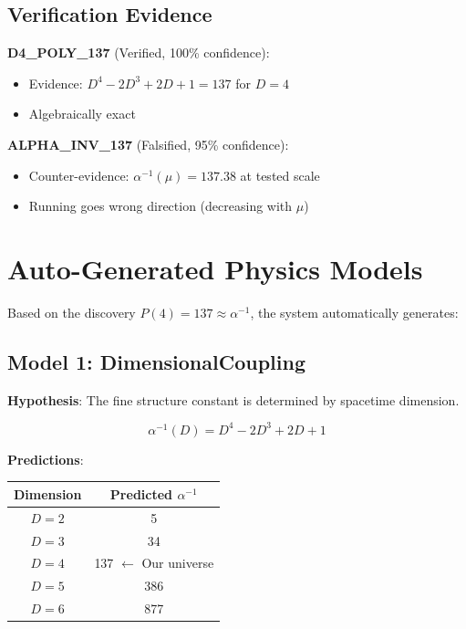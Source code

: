 \documentclass[11pt,a4paper]{article}
\begin{document}
\subsection{Verification Evidence}

\textbf{D4\_POLY\_137} (Verified, 100\% confidence):
\begin{itemize}
    \item Evidence: $D^4 - 2D^3 + 2D + 1 = 137$ for $D = 4$
    \item Algebraically exact
\end{itemize}

\textbf{ALPHA\_INV\_137} (Falsified, 95\% confidence):
\begin{itemize}
    \item Counter-evidence: $\alpha^{-1}(\mu) = 137.38$ at tested scale
    \item Running goes wrong direction (decreasing with $\mu$)
\end{itemize}

\section{Auto-Generated Physics Models}

Based on the discovery $P(4) = 137 \approx \alpha^{-1}$, the system automatically generates:

\subsection{Model 1: DimensionalCoupling}

\textbf{Hypothesis}: The fine structure constant is determined by spacetime dimension.

\begin{equation}
\alpha^{-1}(D) = D^4 - 2D^3 + 2D + 1
\end{equation}

\textbf{Predictions}:
\begin{center}
\begin{tabular}{|c|c|}
\hline
Dimension & Predicted $\alpha^{-1}$ \\
\hline
$D = 2$ & 5 \\
$D = 3$ & 34 \\
$D = 4$ & 137 $\leftarrow$ Our universe \\
$D = 5$ & 386 \\
$D = 6$ & 877 \\
\hline
\end{tabular}
\end{center}
\end{document}
